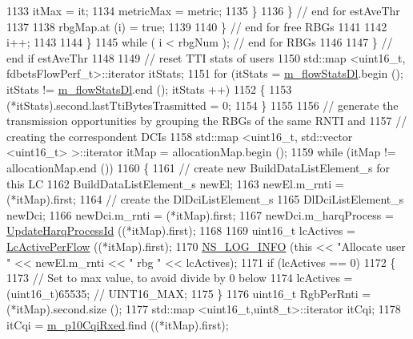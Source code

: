 \begin{DoxyCode}
1133                       itMax = it;
1134                       metricMax = metric;
1135                     \}
1136                 \} \textcolor{comment}{// end for estAveThr}
1137 
1138               rbgMap.at (i) = \textcolor{keyword}{true};
1139 
1140             \} \textcolor{comment}{// end for free RBGs}
1141 
1142           i++;
1143 
1144         \} 
1145       \textcolor{keywordflow}{while} ( i < rbgNum ); \textcolor{comment}{// end for RBGs}
1146 
1147     \} \textcolor{comment}{// end if estAveThr}
1148 
1149   \textcolor{comment}{// reset TTI stats of users}
1150   std::map <uint16\_t, fdbetsFlowPerf\_t>::iterator itStats;
1151   \textcolor{keywordflow}{for} (itStats = \hyperlink{classns3_1_1FdBetFfMacScheduler_a347c3f4c314a6791eef27d768927392a}{m\_flowStatsDl}.begin (); itStats != \hyperlink{classns3_1_1FdBetFfMacScheduler_a347c3f4c314a6791eef27d768927392a}{m\_flowStatsDl}.end (); itStats
      ++)
1152     \{
1153       (*itStats).second.lastTtiBytesTrasmitted = 0;
1154     \}
1155 
1156   \textcolor{comment}{// generate the transmission opportunities by grouping the RBGs of the same RNTI and}
1157   \textcolor{comment}{// creating the correspondent DCIs}
1158   std::map <uint16\_t, std::vector <uint16\_t> >::iterator itMap = allocationMap.begin ();
1159   \textcolor{keywordflow}{while} (itMap != allocationMap.end ())
1160     \{
1161       \textcolor{comment}{// create new BuildDataListElement\_s for this LC}
1162       BuildDataListElement\_s newEl;
1163       newEl.m\_rnti = (*itMap).first;
1164       \textcolor{comment}{// create the DlDciListElement\_s}
1165       DlDciListElement\_s newDci;
1166       newDci.m\_rnti = (*itMap).first;
1167       newDci.m\_harqProcess = \hyperlink{classns3_1_1FdBetFfMacScheduler_aa99e266c0e486f1a8456f68edad608d7}{UpdateHarqProcessId} ((*itMap).first);
1168 
1169       uint16\_t lcActives = \hyperlink{classns3_1_1FdBetFfMacScheduler_ab7b4bf68215af4558bd0499a3e81881a}{LcActivePerFlow} ((*itMap).first);
1170       \hyperlink{group__logging_gafbd73ee2cf9f26b319f49086d8e860fb}{NS\_LOG\_INFO} (\textcolor{keyword}{this} << \textcolor{stringliteral}{"Allocate user "} << newEl.m\_rnti << \textcolor{stringliteral}{" rbg "} << lcActives);
1171       \textcolor{keywordflow}{if} (lcActives == 0)
1172         \{
1173           \textcolor{comment}{// Set to max value, to avoid divide by 0 below}
1174           lcActives = (uint16\_t)65535; \textcolor{comment}{// UINT16\_MAX;}
1175         \}
1176       uint16\_t RgbPerRnti = (*itMap).second.size ();
1177       std::map <uint16\_t,uint8\_t>::iterator itCqi;
1178       itCqi = \hyperlink{classns3_1_1FdBetFfMacScheduler_a122fbac27516524b54245db095d9162c}{m\_p10CqiRxed}.find ((*itMap).first);

\end{DoxyCode}
